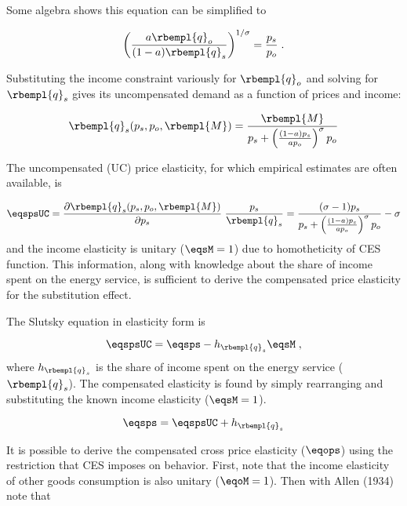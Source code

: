 Some algebra shows this equation can be simplified to 

\begin{equation}
 \left( \frac {a \rbempl{q}_o}{(1-a) \rbempl{q}_s} \right ) ^ {1/\sigma} =
           \frac{ p_s }{ p_o} \; .
\end{equation}

Substituting the income constraint variously for $\rbempl{q}_o$ and solving
for $ \rbempl{q}_s$ gives its uncompensated demand as a function of 
prices and income:

\begin{equation}
 \rbempl{q}_s(p_s, p_o, \rbempl{M}) = \frac{ \rbempl{M}}{ p_s +
 \left (\frac{(1-a)p_s}{a p_o}\right)^\sigma p_o }
\end{equation}

The uncompensated (UC) price elasticity, for which empirical estimates are
often available, is

\begin{equation}
  \eqspsUC = \frac {\partial \rbempl{q}_s(p_s, p_o, \rbempl{M})}{\partial p_s} \; 
  \frac{p_s}{\rbempl{q}_s} = \frac{(\sigma - 1)p_s}{p_s +
  \left (\frac{(1-a)p_s}{a p_o}\right)^\sigma p_o} - \sigma 
\end{equation}
%
and the income elasticity is unitary ($\eqsM = 1$) due to homotheticity of CES function.
This information, along with knowledge about the share of income spent on the
energy service, is sufficient to derive the compensated price elasticity for
the substitution effect. 

The Slutsky equation in elasticity form is

\begin{equation}
  \eqspsUC = \eqsps - h_{\rbempl{q}_s} \eqsM \; ,
\end{equation}
%
where $h_{\rbempl{q}_s}$ is the share of income spent 
on the energy service ($\rbempl{q}_s$).
The compensated elasticity is found by simply rearranging and substituting the known 
income elasticity ($\eqsM = 1$).

\begin{equation} \label{eq:eqsps}
  \eqsps = \eqspsUC + h_{\rbempl{q}_s}
\end{equation}

It is possible to derive the compensated cross price elasticity ($\eqops$)
using the restriction that CES imposes on behavior.
First, note that 
the income elasticity of other goods consumption is also unitary ($\eqoM = 1$).
Then with Allen (1934) note that

